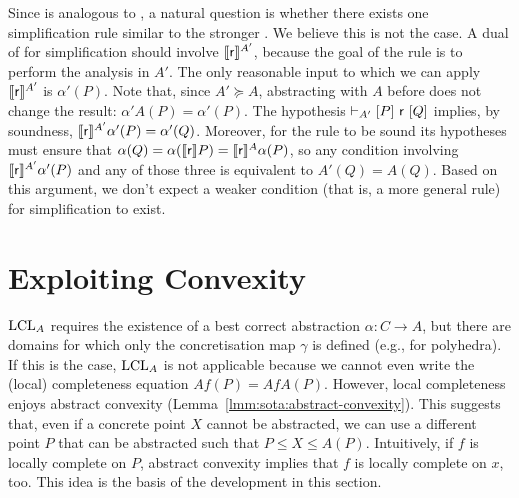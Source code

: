 Since  is analogous to , a natural question is whether there exists one simplification rule similar to the stronger . We believe this is not the case.
A dual of  for simplification should involve $\llbracket\mathsf{r}\rrbracket^{A'}$, because the goal of the rule is to perform the analysis in $A'$. The only reasonable input to which we can apply $\llbracket\mathsf{r}\rrbracket^{A'}$ is $\alpha'(P)$. Note that, since $A' \succeq A$, abstracting with $A$ before does not change the result: $\alpha' A(P) = \alpha'(P)$. The hypothesis $\vdash_{A'}\nobreak[P]~\mathsf{r}~[Q]$ implies, by soundness, $\llbracket\mathsf{r}\rrbracket^{A'} \alpha'(P) = \alpha'(Q)$. Moreover, for the rule to be sound its hypotheses must ensure that $\alpha(Q) = \alpha(\llbracket\mathsf{r}\rrbracket P) = \llbracket\mathsf{r}\rrbracket^{A} \alpha(P)$, so any condition involving $\llbracket\mathsf{r}\rrbracket^{A'} \alpha'(P)$ and any of those three is equivalent to $A'(Q) = A(Q)$.
Based on this argument, we don't expect a weaker condition (that is, a more general rule) for simplification to exist.

\section{Exploiting Convexity}
$\text{LCL}_A$ requires the existence of a best correct abstraction $\alpha : C \rightarrow A$, but there are domains for which only the concretisation map $\gamma$ is defined (e.g., for polyhedra). If this is the case, $\text{LCL}_A$ is not applicable because we cannot even write the (local) completeness equation $A f(P) = A f A(P)$.
However, local completeness enjoys abstract convexity (Lemma~\ref{lmm:sota:abstract-convexity}). This suggests that, even if a concrete point $X$ cannot be abstracted, we can use a different point $P$ that can be abstracted such that $P \le X \le A(P)$. Intuitively, if $f$ is locally complete on $P$, abstract convexity implies that $f$ is locally complete on $x$, too. This idea is the basis of the development in this section.

